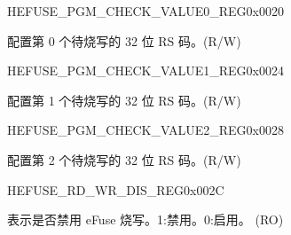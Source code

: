 \begin{register}{H}{EFUSE\_PGM\_CHECK\_VALUE0\_REG}{0x0020}\label{regdesc:EFUSEPGMCHECKVALUE0REG}
%
\regnewline%
\begin{regdesc}\begin{reglist}
\label{fielddesc:EFUSEPGMRSDATA0}\item [EFUSE\_PGM\_RS\_DATA\_0] 配置第 0 个待烧写的 32 位 RS 码。(R/W)
\end{reglist}\end{regdesc}
\end{register}


\begin{register}{H}{EFUSE\_PGM\_CHECK\_VALUE1\_REG}{0x0024}\label{regdesc:EFUSEPGMCHECKVALUE1REG}
%
\regnewline%
\begin{regdesc}\begin{reglist}
\label{fielddesc:EFUSEPGMRSDATA1}\item [EFUSE\_PGM\_RS\_DATA\_1] 配置第 1 个待烧写的 32 位 RS 码。(R/W)
\end{reglist}\end{regdesc}
\end{register}


\begin{register}{H}{EFUSE\_PGM\_CHECK\_VALUE2\_REG}{0x0028}\label{regdesc:EFUSEPGMCHECKVALUE2REG}
%
\regnewline%
\begin{regdesc}\begin{reglist}
\label{fielddesc:EFUSEPGMRSDATA2}\item [EFUSE\_PGM\_RS\_DATA\_2] 配置第 2 个待烧写的 32 位 RS 码。(R/W)
\end{reglist}\end{regdesc}
\end{register}


\begin{register}{H}{EFUSE\_RD\_WR\_DIS\_REG}{0x002C}\label{regdesc:EFUSERDWRDISREG}
%
%
\regnewline%
\begin{regdesc}\begin{reglist}
\label{fielddesc:EFUSEWRDIS}\item [EFUSE\_WR\_DIS] 表示是否禁用 eFuse 烧写。1:禁用。0:启用。 (RO)
\end{reglist}\end{regdesc}
\end{register}


